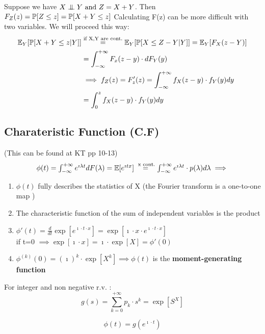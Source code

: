 Suppose we have $X \mathrel{\perp\mspace{-10mu}\perp} Y \text{ and } Z=X+Y$. Then $F_Z(z) = \mathbb{P}[Z\le z] = \mathbb{P}[X+Y \le z]$
Calculating F(z) can be more difficult with two variables. We will proceed this way:
\\
\begin{equation}
  $$
  \begin{split}
    \exp_{Y}[\prob[X+Y \le z | Y]]  &\stackrel{\text{if X,Y are cont.}}{=} \exp_Y [\prob[X \le Z - Y | Y]] = \exp_Y[F_X(z-Y)]\\
    &=\int_{-\infty}^{+\infty}F_x(z-y) \cdot dF_Y(y) \\
    &\implies f_Z(z) = F'_z(z) = \int_{-\infty}^{+\infty}{f_X(z-y)\cdot f_Y(y) dy} \\
    &=\int_{0}^{z}{f_X(z-y) \cdot f_Y(y) dy}
  \end{split}
  $$
\end{equation}


\subsection{Charateristic Function (C.F)}
(This can be found at KT pp 10-13)
\begin{equation}
  $$\phi(t) = \int_{-\infty}^{+\infty}e^{\imath \lambda t} dF(\lambda) = \exp[e^{\imath t x}]\stackrel{\text{ x cont.}}{=}
  \int_{-\infty}^{+\infty}e^{\imath \lambda t} \cdot p(\lambda) d\lambda
  \\ \implies$$
\end{equation}
\begin{enumerate}
  \item $\phi(t)$ fully describes the statistics of X (the Fourier transform is a  one-to-one map )
  \item The characteristic function of the sum of independent variables is the product
  \item $\phi'(t)=\frac{d}{dt} \exp[e^{\imath \cdot t \cdot x}]=\exp[\imath \cdot x \cdot e^{\imath \cdot t \cdot x}]$ \\
  if t=0 $\implies \exp[\imath \cdot x]=\imath \cdot \exp[ X] = \phi'(0)$
  \item $\phi^{(k)}(0) = (\imath)^k \cdot \exp[X^k] \implies \phi(t)$ is the \textbf{moment-generating function}
\end{enumerate}


For integer and non negative r.v. :
$$g(s)=\sum\limits_{k=0}^{+\infty}p_k \cdot s^k = \exp[S^X]$$

$$\phi(t) = g(e^{\imath \cdot t})$$


